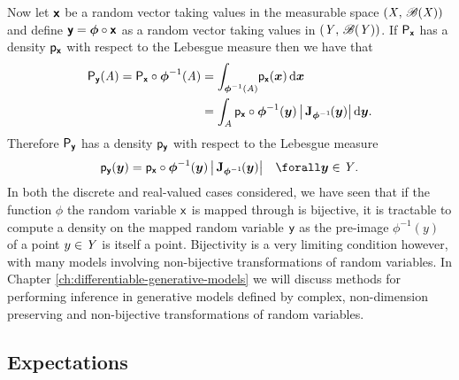 Now let $\boldsymbol{\mathsf{x}}$ be a random vector taking values in the measurable space $(\mathit{X},\,\mathscr{B}(\mathit{X}))$ and define $\boldsymbol{\mathsf{y}} = \boldsymbol{\phi} \circ \boldsymbol{\mathsf{x}}$ as a random vector taking values in  $(\mathit{Y},\,\mathscr{B}(\mathit{Y}))$. If $\mathsf{P}_{\boldsymbol{\mathsf{x}}}$ has a density $\mathsf{p}_{\boldsymbol{\mathsf{x}}}$ with respect to the Lebesgue measure then we have that
\begin{equation}
\begin{split}
  \prob{\rvct{y}}(\set{A}) = \prob{\rvct{x}}\circ\vct{\phi}^{-1}(\set{A})
  &= \int_{\vct{\phi}^{-1}(\set{A})}\kern-2pt\pden{\rvct{x}}(\vct{x})\,\dr\vct{x}\\
  &= \int_{\set{A}} \pden{\rvct{x}}\circ\vct{\phi}^{-1}(\vct{y}) \,\left|\,\jacob{\vct{\phi}^{-1}}{\vct{y}}\right|\,\dr\vct{y}.
\end{split}
\end{equation}
Therefore $\mathsf{P}_{\boldsymbol{\mathsf{y}}}$ has a density $\mathsf{p}_{\boldsymbol{\mathsf{y}}}$ with respect to the Lebesgue measure 
\begin{equation}\label{eq:change-of-variables-vector-bijective}
  \pden{\rvct{y}}(\vct{y}) = 
    \pden{\rvct{x}}\circ\vct{\phi}^{-1}(\vct{y})\,
    \left|\,\jacob{\vct{\phi}^{-1}}{\vct{y}}\right|
  \quad \forall \vct{y} \in \set{Y}.
\end{equation}
In both the discrete and real-valued cases considered, we have seen that if the function $\phi$ the random variable $\mathsf{x}$ is mapped through is bijective, it is tractable to compute a density on the mapped random variable $\mathsf{y}$ as the pre-image $\phi^{-1}(y)$ of a point $y \in \mathit{Y}$ is itself a point. Bijectivity is a very limiting condition however, with many models involving non-bijective transformations of random variables. In Chapter \ref{ch:differentiable-generative-models} we will discuss methods for performing inference in generative models defined by complex, non-dimension preserving and non-bijective transformations of random variables.

\subsection{Expectations}\label{subsec:expectations}

